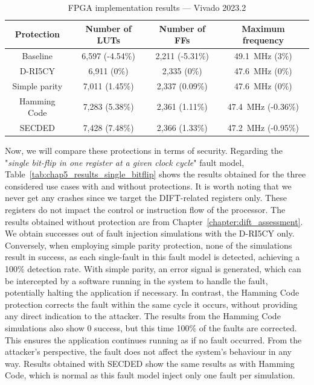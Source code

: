 \begin{table}[t]
    \footnotesize
    \centering
    \caption{FPGA implementation results — Vivado 2023.2}
    \label{tab:chap5_implementation}
    \setlength{\tabcolsep}{3pt}
    \begin{tabular}{@{}c|ccc@{}}
        \toprule
        Protection    & Number of LUTs   & Number of FFs    & Maximum frequency                \\ \midrule
        Baseline      & 6,597 (-4.54\%) & 2,211 (-5.31\%) & \SI{49.1}{\mega\hertz} (3\%)     \\
        D-RI5CY       & 6,911 (0\%)     & 2,335 (0\%)     & \SI{47.6}{\mega\hertz} (0\%)     \\
        Simple parity & 7,011 (1.45\%)  & 2,337 (0.09\%)  & \SI{47.6}{\mega\hertz} (0\%)     \\
        Hamming Code  & 7,283 (5.38\%)  & 2,361 (1.11\%)  & \SI{47.4}{\mega\hertz} (-0.36\%) \\
        SECDED        & 7,428 (7.48\%)  & 2,366 (1.33\%)  & \SI{47.2}{\mega\hertz} (-0.95\%) \\
        \bottomrule
    \end{tabular}
\end{table}

Now, we will compare these protections in terms of security.
Regarding the "\textit{single bit-flip in one register at a given clock cycle}" fault model, Table~\ref{tab:chap5_results_single_bitflip} shows the results obtained for the three considered use cases with and without protections. It is worth noting that we never get any crashes since we target the DIFT-related registers only. These registers do not impact the control or instruction flow of the processor.
The results obtained without protection are from Chapter~\ref{chapter:dift_assessment}. We obtain  successes out of  fault injection simulations with the D-RI5CY only.
Conversely, when employing simple parity protection, none of the  simulations result in success, as each single-fault in this fault model is detected, achieving a 100\% detection rate. With simple parity, an error signal is generated, which can be intercepted by a software running in the system to handle the fault, potentially halting the application if necessary. In contrast, the Hamming Code protection corrects the fault within the same cycle it occurs, without providing any direct indication to the attacker. The results from the Hamming Code simulations also show 0 success, but this time 100\% of the faults are corrected. This ensures the application continues running as if no fault occurred. From the attacker’s perspective, the fault does not affect the system’s behaviour in any way.
Results obtained with SECDED show the same results as with Hamming Code, which is normal as this fault model inject only one fault per simulation.

